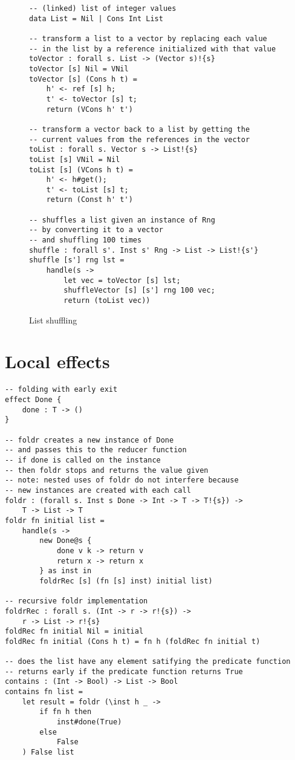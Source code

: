 \begin{figure}[H]
\caption{List shuffling}
\begin{verbatim}
-- (linked) list of integer values
data List = Nil | Cons Int List

-- transform a list to a vector by replacing each value
-- in the list by a reference initialized with that value
toVector : forall s. List -> (Vector s)!{s}
toVector [s] Nil = VNil
toVector [s] (Cons h t) =
	h' <- ref [s] h;
	t' <- toVector [s] t;
	return (VCons h' t')

-- transform a vector back to a list by getting the
-- current values from the references in the vector
toList : forall s. Vector s -> List!{s}
toList [s] VNil = Nil
toList [s] (VCons h t) =
	h' <- h#get();
	t' <- toList [s] t;
	return (Const h' t')

-- shuffles a list given an instance of Rng
-- by converting it to a vector
-- and shuffling 100 times
shuffle : forall s'. Inst s' Rng -> List -> List!{s'}
shuffle [s'] rng lst =
	handle(s ->
		let vec = toVector [s] lst;
		shuffleVector [s] [s'] rng 100 vec;
		return (toList vec))
\end{verbatim}
\label{fig:listshuffle}
\end{figure}

\section{Local effects}
\begin{verbatim}
-- folding with early exit
effect Done {
	done : T -> ()
}

-- foldr creates a new instance of Done
-- and passes this to the reducer function
-- if done is called on the instance
-- then foldr stops and returns the value given
-- note: nested uses of foldr do not interfere because
-- new instances are created with each call
foldr : (forall s. Inst s Done -> Int -> T -> T!{s}) ->
	T -> List -> T
foldr fn initial list =
	handle(s ->
		new Done@s {
			done v k -> return v
			return x -> return x
		} as inst in
		foldrRec [s] (fn [s] inst) initial list)

-- recursive foldr implementation
foldrRec : forall s. (Int -> r -> r!{s}) ->
	r -> List -> r!{s}
foldRec fn initial Nil = initial
foldRec fn initial (Cons h t) = fn h (foldRec fn initial t)

-- does the list have any element satifying the predicate function
-- returns early if the predicate function returns True
contains : (Int -> Bool) -> List -> Bool
contains fn list =
	let result = foldr (\inst h _ ->
		if fn h then
			inst#done(True)
		else
			False
	) False list
\end{verbatim}
